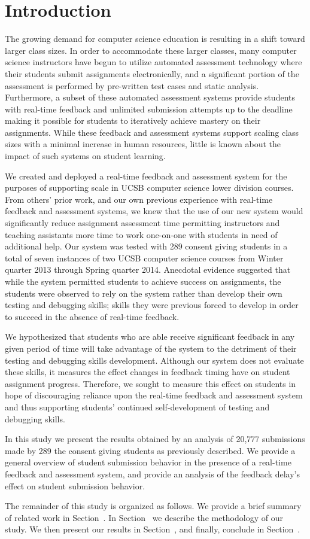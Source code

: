 \section{Introduction}
The growing demand for computer science education is resulting in a shift
toward larger class sizes. In order to accommodate these larger classes, many
computer science instructors have begun to utilize automated assessment
technology where their students submit assignments electronically, and a
significant portion of the assessment is performed by pre-written test cases
and static analysis. Furthermore, a subset of these automated assessment
systems provide students with real-time feedback and unlimited submission
attempts up to the deadline making it possible for students to iteratively
achieve mastery on their assignments. While these feedback and assessment
systems support scaling class sizes with a minimal increase in human resources,
little is known about the impact of such systems on student learning.

We created and deployed a real-time feedback and assessment system for the
purposes of supporting scale in UCSB computer science lower division
courses. From others' prior work, and our own previous experience with
real-time feedback and assessment systems, we knew that the use of our new
system would significantly reduce assignment assessment time permitting
instructors and teaching assistants more time to work one-on-one with students
in need of additional help. Our system was tested with 289 consent giving
students in a total of seven instances of two UCSB computer science courses
from Winter quarter 2013 through Spring quarter 2014. Anecdotal evidence
suggested that while the system permitted students to achieve success on
assignments, the students were observed to rely on the system rather than
develop their own testing and debugging skills; skills they were previous
forced to develop in order to succeed in the absence of real-time feedback.

We hypothesized that students who are able receive significant feedback in any
given period of time will take advantage of the system to the detriment of
their testing and debugging skills development. Although our system does not
evaluate these skills, it measures the effect changes in feedback timing have
on student assignment progress. Therefore, we sought to measure this effect on
students in hope of discouraging reliance upon the real-time feedback and
assessment system and thus supporting students' continued self-development of
testing and debugging skills.

In this study we present the results obtained by an analysis of 20,777
submissions made by 289 the consent giving students as previously described. We
provide a general overview of student submission behavior in the presence of a
real-time feedback and assessment system, and provide an analysis of the
feedback delay's effect on student submission behavior.

The remainder of this study is organized as follows. We provide a brief summary
of related work in Section~. In
Section~ we describe the methodology of our study. We
then present our results in Section~, and finally,
conclude in Section~.
